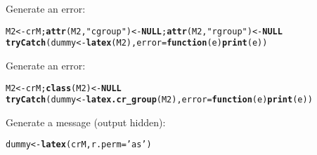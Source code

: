 \documentclass{article}\usepackage[]{graphicx}\usepackage[]{color}
\makeatletter
\newcommand{\hlstr}[1]{\textcolor[rgb]{0.192,0.494,0.8}{#1}}%
\newcommand{\hlstd}[1]{\textcolor[rgb]{0.345,0.345,0.345}{#1}}%
\newcommand{\hlkwa}[1]{\textcolor[rgb]{0.161,0.373,0.58}{\textbf{#1}}}%
\newcommand{\hlkwb}[1]{\textcolor[rgb]{0.69,0.353,0.396}{#1}}%
\newcommand{\hlkwc}[1]{\textcolor[rgb]{0.333,0.667,0.333}{#1}}%
\newcommand{\hlkwd}[1]{\textcolor[rgb]{0.737,0.353,0.396}{\textbf{#1}}}%
\newenvironment{kframe}{%
 \def\at@end@of@kframe{}%
 \ifinner\ifhmode%
  \def\at@end@of@kframe{\end{minipage}}%
  \begin{minipage}{\columnwidth}%
 \fi\fi%
 \def\FrameCommand##1{\hskip\@totalleftmargin \hskip-\fboxsep
 \colorbox{shadecolor}{##1}\hskip-\fboxsep
     \hskip-\linewidth \hskip-\@totalleftmargin \hskip\columnwidth}%
 \MakeFramed {\advance\hsize-\width
   \@totalleftmargin\z@ \linewidth\hsize
   \@setminipage}}%
 {\par\unskip\endMakeFramed%
 \at@end@of@kframe}
\newenvironment{knitrout}{}{} %
\makeatother
\begin{document}
\noindent Generate an error:
\begin{knitrout}
\color{fgcolor}\begin{kframe}
\begin{alltt}
\hlstd{M2} \hlkwb{<-} \hlstd{crM;} \hlkwd{attr}\hlstd{(M2,} \hlstr{"cgroup"}\hlstd{)} \hlkwb{<-} \hlkwa{NULL}\hlstd{;} \hlkwd{attr}\hlstd{(M2,} \hlstr{"rgroup"}\hlstd{)} \hlkwb{<-} \hlkwa{NULL}
\hlkwd{tryCatch}\hlstd{(dummy} \hlkwb{<-} \hlkwd{latex}\hlstd{(M2),} \hlkwc{error} \hlstd{=} \hlkwa{function}\hlstd{(}\hlkwc{e}\hlstd{)} \hlkwd{print}\hlstd{(e))}
\end{alltt}
\end{kframe}
\end{knitrout}
\noindent Generate an error:
\begin{knitrout}
\color{fgcolor}\begin{kframe}
\begin{alltt}
\hlstd{M2} \hlkwb{<-} \hlstd{crM;} \hlkwd{class}\hlstd{(M2)} \hlkwb{<-} \hlkwa{NULL}
\hlkwd{tryCatch}\hlstd{(dummy} \hlkwb{<-} \hlkwd{latex.cr_group}\hlstd{(M2),} \hlkwc{error} \hlstd{=} \hlkwa{function}\hlstd{(}\hlkwc{e}\hlstd{)} \hlkwd{print}\hlstd{(e))}
\end{alltt}
\end{kframe}
\end{knitrout}
\noindent Generate a message (output hidden):
\begin{knitrout}
\color{fgcolor}\begin{kframe}
\begin{alltt}
\hlstd{dummy} \hlkwb{<-} \hlkwd{latex}\hlstd{(crM,} \hlkwc{r.perm}\hlstd{=}\hlstr{'as'}\hlstd{)}
\end{alltt}


{\ttfamily\noindent\itshape\color{messagecolor}{\#\# [latex.cr\_group] 'rperm' interpreted as 'as.is'}}\end{kframe}
\end{knitrout}
\end{document}
